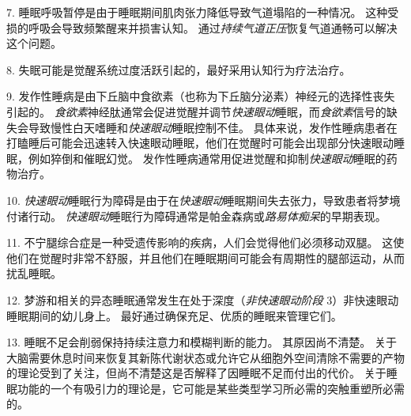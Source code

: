 7. 睡眠呼吸暂停是由于睡眠期间肌肉张力降低导致气道塌陷的一种情况。
这种受损的呼吸会导致频繁醒来并损害认知。
通过\textit{持续气道正压}恢复气道通畅可以解决这个问题。


8. 失眠可能是觉醒系统过度活跃引起的，最好采用认知行为疗法治疗。


9. 发作性睡病是由下丘脑中食欲素（也称为下丘脑分泌素）神经元的选择性丧失引起的。
\textit{食欲素}神经肽通常会促进觉醒并调节\textit{快速眼动}睡眠，而\textit{食欲素}信号的缺失会导致慢性白天嗜睡和\textit{快速眼动}睡眠控制不佳。
具体来说，发作性睡病患者在打瞌睡后可能会迅速转入快速眼动睡眠，他们在觉醒时可能会出现部分快速眼动睡眠，例如猝倒和催眠幻觉。
发作性睡病通常用促进觉醒和抑制\textit{快速眼动}睡眠的药物治疗。


10. \textit{快速眼动}睡眠行为障碍是由于在\textit{快速眼动}睡眠期间失去张力，导致患者将梦境付诸行动。
\textit{快速眼动}睡眠行为障碍通常是帕金森病或\textit{路易体痴呆}的早期表现。


11. 不宁腿综合症是一种受遗传影响的疾病，人们会觉得他们必须移动双腿。
这使他们在觉醒时非常不舒服，并且他们在睡眠期间可能会有周期性的腿部运动，从而扰乱睡眠。


12. 梦游和相关的异态睡眠通常发生在处于深度（\textit{非快速眼动阶段} 3）非快速眼动睡眠期间的幼儿身上。
最好通过确保充足、优质的睡眠来管理它们。


13. 睡眠不足会削弱保持持续注意力和模糊判断的能力。
其原因尚不清楚。
关于大脑需要休息时间来恢复其新陈代谢状态或允许它从细胞外空间清除不需要的产物的理论受到了关注，但尚不清楚这是否解释了因睡眠不足而付出的代价。
关于睡眠功能的一个有吸引力的理论是，它可能是某些类型学习所必需的突触重塑所必需的。


